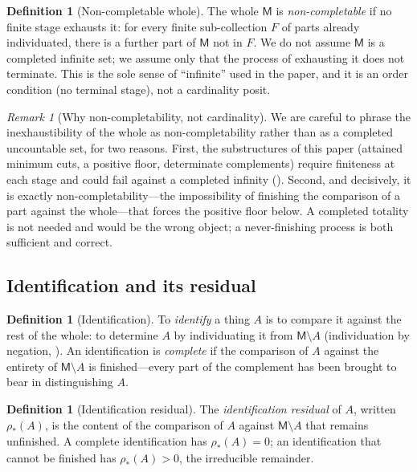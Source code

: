 \documentclass[11pt,a4paper]{article}
\theoremstyle{thmstyle}
\theoremstyle{definition}
\newtheorem{definition}[theorem]{Definition}
\theoremstyle{remark}
\newtheorem{remark}[theorem]{Remark}
\newcommand{\med}{\mathsf{M}}             %
\newcommand{\idres}{\rho_{\!*}}            %
\begin{document}
\begin{definition}[Non-completable whole]
\label{def:noncompletable}
The whole $\med$ is \emph{non-completable} if no finite stage exhausts it: for
every finite sub-collection $F$ of parts already individuated, there is a further
part of $\med$ not in $F$. We do not assume $\med$ is a completed infinite set;
we assume only that the process of exhausting it does not terminate. This is the
sole sense of ``infinite'' used in the paper, and it is an order condition
\textup{(}no terminal stage\textup{)}, not a cardinality posit.
\end{definition}

\begin{remark}[Why non-completability, not cardinality]
\label{rem:noncompletable}
We are careful to phrase the inexhaustibility of the whole as
non-completability rather than as a completed uncountable set, for two reasons.
First, the substructures of this paper \textup{(}attained minimum cuts, a
positive floor, determinate complements\textup{)} require finiteness at each
stage and could fail against a completed infinity \textup{(}\textup{)}.
Second, and decisively, it is exactly non-completability---the impossibility of
finishing the comparison of a part against the whole---that forces the positive
floor below. A completed totality is not needed and would be the wrong object; a
never-finishing process is both sufficient and correct.
\end{remark}

\subsection{Identification and its residual}

\begin{definition}[Identification]
\label{def:identification}
To \emph{identify} a thing $A$ is to compare it against the rest of the whole:
to determine $A$ by individuating it from $\med\setminus A$
\textup{(}individuation by negation, \textup{)}. An
identification is \emph{complete} if the comparison of $A$ against the entirety of
$\med\setminus A$ is finished---every part of the complement has been brought to
bear in distinguishing $A$.
\end{definition}

\begin{definition}[Identification residual]
\label{def:idresidual}
The \emph{identification residual} of $A$, written $\idres(A)$, is the content of
the comparison of $A$ against $\med\setminus A$ that remains unfinished. A
complete identification has $\idres(A)=0$; an identification that cannot be
finished has $\idres(A)>0$, the irreducible remainder.
\end{definition}
\end{document}
